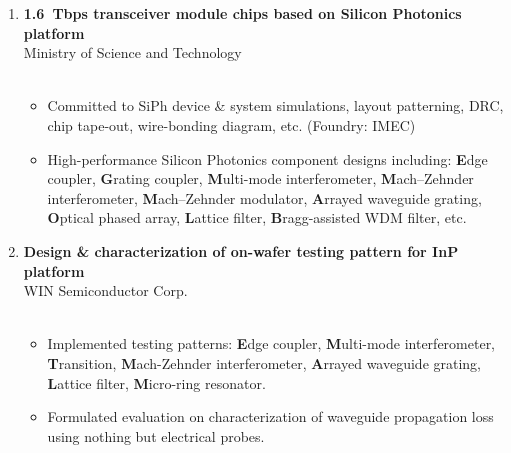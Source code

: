 \documentclass[10pt,a4paper,ragged2e]{altacv}
\begin{document}
    \begin{enumerate}\normalsize
        \justifying
        \item {\bf\large 1.6~Tbps transceiver module chips based on Silicon Photonics platform}\\Ministry of Science and Technology\\
                \small{}
                \small{}\\
                \vspace{-1em}\begin{itemize}\normalsize
                    \item Committed to SiPh device \& system simulations, layout patterning, DRC, 
                            chip tape-out, wire-bonding diagram, etc. (Foundry: IMEC)
                    \item High-performance Silicon Photonics component designs including: 
                            \textbf{E}dge coupler, \textbf{G}rating coupler, \textbf{M}ulti-mode interferometer, 
                            \textbf{M}ach--Zehnder interferometer, \textbf{M}ach--Zehnder modulator, \textbf{A}rrayed waveguide grating, 
                            \textbf{O}ptical phased array, \textbf{L}attice filter, \textbf{B}ragg-assisted WDM filter, etc.
                \end{itemize}
        \divider
        \item {\bf\large Design \& characterization of on-wafer testing pattern for InP platform} \\WIN Semiconductor Corp.\\
                \small{}
                \small{}\\
                \vspace{-1em}\begin{itemize}\normalsize
                    \item Implemented testing patterns: \textbf{E}dge coupler, \textbf{M}ulti-mode interferometer, 
                            \textbf{T}ransition, \textbf{M}ach-Zehnder interferometer, \textbf{A}rrayed waveguide grating, 
                            \textbf{L}attice filter, \textbf{M}icro-ring resonator.
                    \item Formulated evaluation on characterization of waveguide propagation loss using nothing but electrical probes.
                \end{itemize}
    \end{enumerate}
\end{document}

